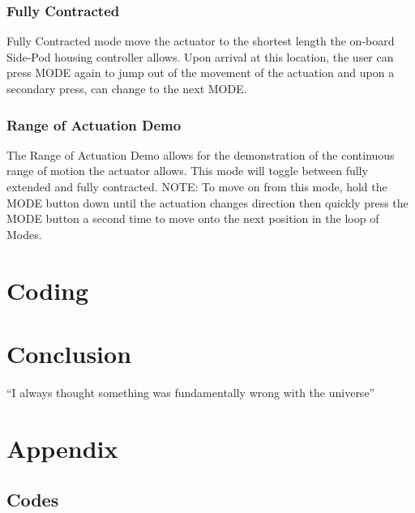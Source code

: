 \documentclass{article}
\begin{document}
\subsubsection{Fully Contracted}
Fully Contracted mode move the actuator to the shortest length the on-board Side-Pod housing controller allows. Upon arrival at this location, the user can press MODE again to jump out of the movement of the actuation and upon a secondary press, can change to the next MODE.
\subsubsection{Range of Actuation Demo}
The Range of Actuation Demo allows for the demonstration of the continuous range of motion the actuator allows. This mode will toggle between fully extended and fully contracted.
\newline \newline
NOTE: To move on from this mode, hold the MODE button down until the actuation changes direction then quickly press the MODE button a second time to move onto the next position in the loop of Modes.


\section{Coding}

\section{Conclusion}
``I always thought something was fundamentally wrong with the universe'' \citep{adams1995hitchhiker}

\section{Appendix}
\subsection{Codes}



\end{document}
